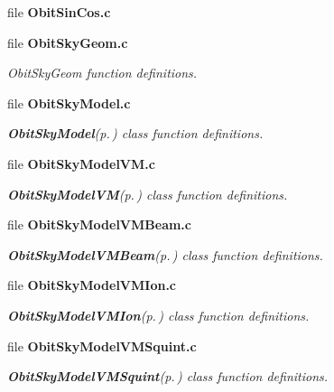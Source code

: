 \begin{CompactItemize}
\item 
file {\bf Obit\-Sin\-Cos.c}
\item 
file {\bf Obit\-Sky\-Geom.c}
\begin{CompactList}\small\item\em Obit\-Sky\-Geom function definitions. \item\end{CompactList}

\item 
file {\bf Obit\-Sky\-Model.c}
\begin{CompactList}\small\item\em {\bf Obit\-Sky\-Model}{\rm (p.\,\pageref{structObitSkyModel})} class function definitions. \item\end{CompactList}

\item 
file {\bf Obit\-Sky\-Model\-VM.c}
\begin{CompactList}\small\item\em {\bf Obit\-Sky\-Model\-VM}{\rm (p.\,\pageref{structObitSkyModelVM})} class function definitions. \item\end{CompactList}

\item 
file {\bf Obit\-Sky\-Model\-VMBeam.c}
\begin{CompactList}\small\item\em {\bf Obit\-Sky\-Model\-VMBeam}{\rm (p.\,\pageref{structObitSkyModelVMBeam})} class function definitions. \item\end{CompactList}

\item 
file {\bf Obit\-Sky\-Model\-VMIon.c}
\begin{CompactList}\small\item\em {\bf Obit\-Sky\-Model\-VMIon}{\rm (p.\,\pageref{structObitSkyModelVMIon})} class function definitions. \item\end{CompactList}

\item 
file {\bf Obit\-Sky\-Model\-VMSquint.c}
\begin{CompactList}\small\item\em {\bf Obit\-Sky\-Model\-VMSquint}{\rm (p.\,\pageref{structObitSkyModelVMSquint})} class function definitions. \item\end{CompactList}


\end{CompactItemize}
